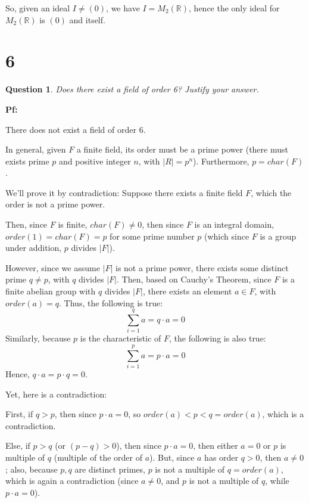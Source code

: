 \documentclass{article}
\newtheorem{question}{Question}
\begin{document}
\hfill

So, given an ideal $I\neq (0)$, we have $I=M_2(\mathbb{R})$, hence the only ideal for $M_2(\mathbb{R})$ is $(0)$ and itself.




\break


\section*{6}
\begin{myBox}[]{}
    \begin{question}
        Does there exist a field of order 6? Justify your answer.
    \end{question}
\end{myBox}

\textbf{Pf:}

There does not exist a field of order $6$. 

In general, given $F$ a finite field, its order must be a prime power (there must exists prime $p$ and positive integer $n$, with $|R|=p^n$). Furthermore, $p=char(F)$.

\hfill

We'll prove it by contradiction: Suppose there exists a finite field $F$, which the order is not a prime power.

Then, since $F$ is finite, $char(F)\neq 0$, then since $F$ is an integral domain, $order(1)=char(F)=p$ for some prime number $p$ (which since $F$ is a group under addition, $p$ divides $|F|$).

However, since we assume $|F|$ is not a prime power, there exists some distinct prime $q\neq p$, with $q$ divides $|F|$.
Then, based on Cauchy's Theorem, since $F$ is a finite abelian group with $q$ divides $|F|$, there exists an element $a\in F$, with $order(a)=q$. Thus, the following is true:
$$\sum_{i=1}^{q}a = q\cdot a = 0$$
Similarly, because $p$ is the characteristic of $F$, the following is also true:
$$\sum_{i=1}^{p}a=p\cdot a = 0$$
Hence, $q\cdot a=p\cdot q=0$.

Yet, here is a contradiction:

First, if $q>p$, then since $p\cdot a=0$, so $order(a)<p<q=order(a)$, which is a contradiction.

Else, if $p>q$ (or $(p-q)>0$), then since $p\cdot a=0$, then either $a=0$ or $p$ is multiple of $q$ (multiple of the order of $a$). But, since $a$ has order $q>0$, then $a\neq 0$;
also, because $p,q$ are distinct primes, $p$ is not a multiple of $q=order(a)$, which is again a contradiction (since $a\neq 0$, and $p$ is not a multiple of $q$, while $p\cdot a=0$).
\end{document}
